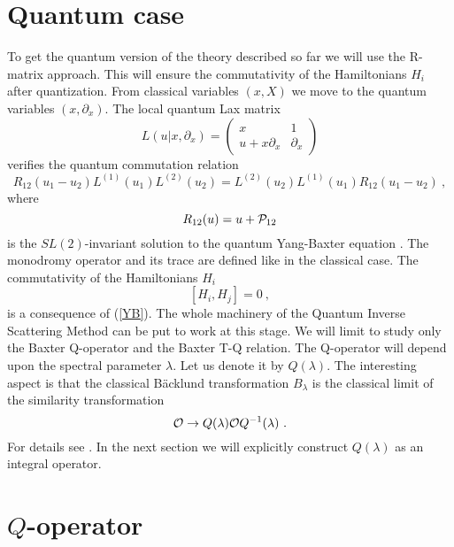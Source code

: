 \documentclass[a4paper,11pt]{article}
\begin{document}
\section{Quantum case}

To get the quantum version of the theory described so far we will use the
R-matrix approach. This will ensure the commutativity of the Hamiltonians
$H_i$ after quantization. {}From classical variables $(x,X)$ we move to the
quantum variables $(x,\partial_x).$ The local quantum Lax matrix
\begin{equation}
\label{quntL}
L(u|x,\partial_x)=\left(\begin{array}{cc}
          x      & 1  \\
           u+x\partial_x     &  \partial_x
         \end{array}\right )
\end{equation}
verifies the quantum commutation relation
\begin{equation}
\label{YB}
R_{12}(u_1-u_2)L^{(1)}(u_1)L^{(2)}(u_2)=L^{(2)}(u_2)L^{(1)}(u_1)R_{12}(u_1-u_2) ~,
\end{equation}
where
\begin{equation}
\label{RR}
R_{12}(u)=u+{\cal P}_{12}
\end{equation}
is the $SL(2)$-invariant solution to the quantum Yang-Baxter equation
\cite{Faddeev}. The monodromy operator and its trace are defined like in the
classical case. The commutativity of the Hamiltonians $H_i$
\begin{equation}
\label{comH}
[H_i,H_j]=0 ~,
\end{equation}
is a consequence of (\ref{YB}). The whole machinery of the Quantum Inverse
Scattering Method can be put to work at this stage. We will limit to study
only the Baxter Q-operator and the Baxter T-Q relation. The Q-operator will
depend upon the spectral parameter $\lambda .$ Let us denote it by
$Q(\lambda ).$ The interesting aspect is that the classical B\"acklund
transformation $B_\lambda $ is the classical limit of the similarity
transformation
\begin{equation}
\label{O}
{\cal O}\to Q(\lambda ){\cal O} Q^{-1}(\lambda ) ~.
\end{equation}
For details see \cite{Kuz}. In the next section we will explicitly
construct $Q(\lambda)$ as an integral operator.

\section{$Q$-operator}
\end{document}

